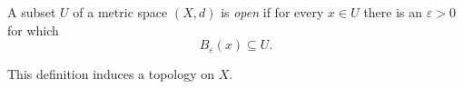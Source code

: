 
A subset $U$ of a metric space $(X,d)$ is \emph{open} if for every $x\in U$ there is an $\varepsilon>0$ for which
\[
B_{\varepsilon}(x)\subseteq U.
\]

This definition induces a topology on $X$.
